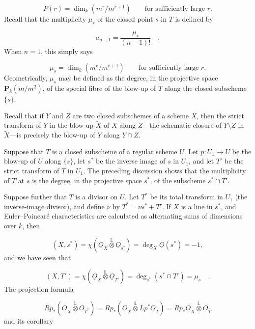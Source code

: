 \begin{equation*}
P(r)=\dim_k(m^r/m^{r+1})\qquad\text{for sufficiently large }r.
\end{equation*}
Recall that the multiplicity $\mu_s$ of the closed point $s$ in $T$ is defined by

\begin{equation*}
a_{n-1}=\frac{\mu_s}{(n-1)!} \quad .
\end{equation*}
When $n=1$, this simply says

\begin{equation*}
\mu_s=\dim_k(m^r/m^{r+1})\qquad\text{for sufficiently large }r.
\end{equation*}
Geometrically, $\mu_s$ may be defined as the degree, in the projective space
$\mathbf P_k(m/m^2)$, of the special fibre of the blow-up of $T$ along the closed
subscheme $\{s\}$.


Recall that if $Y$ and $Z$ are two closed subschemes of a scheme $X$, then the
strict transform of $Y$ in the blow-up $\widetilde X$ of $X$ along $Z$---the
schematic closure of $Y\setminus Z$ in $\widetilde X$---is precisely the blow-up
of $Y$ along $Y\cap Z$.

Suppose that $T$ is a closed subscheme of a regular scheme $U$.  Let
$p:U_1\longrightarrow U$ be the blow-up of $U$ along $\{s\}$, let $s^*$ be the
inverse image of $s$ in $U_1$, and let $T'$ be the strict transform of $T$ in
$U_1$.  The preceding discussion shows that the multiplicity of $T$ at $s$ is
the degree, in the projective space $s^*$, of the subscheme $s^*\cap T'$.

Suppose further that $T$ is a divisor on $U$.  Let $T^*$ be its total transform
in $U_1$ (the inverse-image divisor), and define $\nu$ by
$T^*=\nu s^*+T'$.  If $X$ is a line in $s^*$, and Euler--Poincaré
characteristics are calculated as alternating sums of dimensions over $k$, then

\begin{equation}\tag{2.6.1}
(X,s^*)=
\chi(\underline{O}_X\overset{\mathbb L}{\otimes}\underline{O}_{s^*})
=\deg_X\underline{O}(s^*)=-1,
\end{equation}
and we have seen that

\begin{equation}\tag{2.6.2}
(X,T')=
\chi(\underline{O}_X\overset{\mathbb L}{\otimes}\underline{O}_{T'})
=\deg_{s^*}(s^*\cap T')=\mu_s \quad .
\end{equation}
The projection formula

\begin{equation*}
Rp_*(\underline{O}_X\overset{\mathbb L}{\otimes}\underline{O}_{T^*})
=Rp_*(\underline{O}_X\overset{\mathbb L}{\otimes}Lp^*\underline{O}_T)
=Rp_*\underline{O}_X\overset{\mathbb L}{\otimes}\underline{O}_T
\end{equation*}
and its corollary

